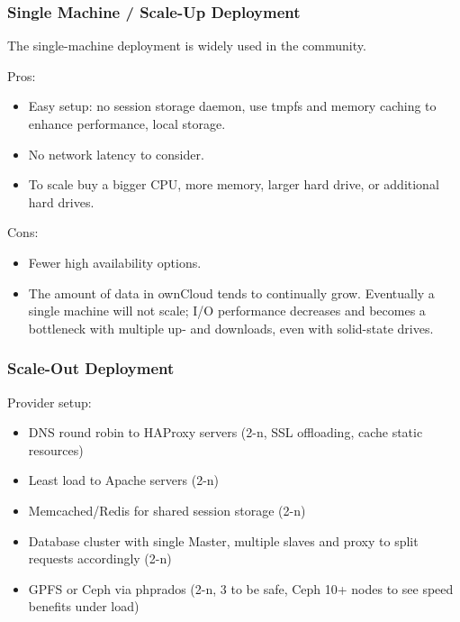 \documentclass[letterpaper,10pt,english]{sphinxmanual}
\begin{document}
\subsubsection{Single Machine / Scale-Up Deployment}
\label{installation/deployment_recommendations:single-machine-scale-up-deployment}
The single-machine deployment is widely used in the community.

Pros:
\begin{itemize}
\item {} 
Easy setup: no session storage daemon, use tmpfs and memory caching to
enhance performance, local storage.

\item {} 
No network latency to consider.

\item {} 
To scale buy a bigger CPU, more memory, larger hard drive, or additional hard
drives.

\end{itemize}

Cons:
\begin{itemize}
\item {} 
Fewer high availability options.

\item {} 
The amount of data in ownCloud tends to continually grow. Eventually a
single machine will not scale; I/O performance decreases and becomes a
bottleneck with multiple up- and downloads, even with solid-state drives.

\end{itemize}


\subsubsection{Scale-Out Deployment}
\label{installation/deployment_recommendations:scale-out-deployment}
Provider setup:
\begin{itemize}
\item {} 
DNS round robin to HAProxy servers (2-n, SSL offloading, cache static
resources)

\item {} 
Least load to Apache servers (2-n)

\item {} 
Memcached/Redis for shared session storage (2-n)

\item {} 
Database cluster with single Master, multiple slaves and proxy to split
requests accordingly (2-n)

\item {} 
GPFS or Ceph via phprados (2-n, 3 to be safe, Ceph 10+ nodes to see speed
benefits under load)

\end{itemize}
\end{document}
